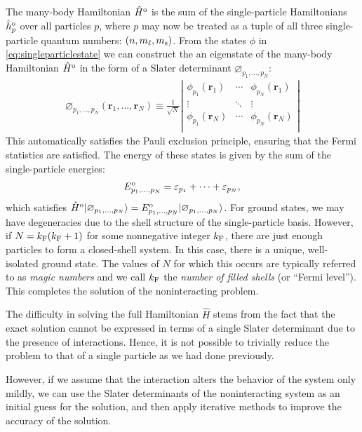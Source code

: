 \documentclass[amsmath, amssymb, aps, floatfix, nofootinbib, preprintnumbers,showpacs, superscriptaddress, twocolumn]{revtex4-1}
\newcommand{\ket}[1]{| #1 \rangle}
\begin{document}
The many-body Hamiltonian $\hat H^{\text o}$ is the sum of the single-particle
Hamiltonians $\hat h^{\text o}_p$ over all particles $p$, where $p$ may now be
treated as a tuple of all three single-particle quantum numbers:
$(n, m_\ell, m_{\text s})$.  From the states $\phi$ in
\eqref{eq:singleparticlestate} we can construct the an eigenstate of the
many-body Hamiltonian $\hat H^{\text o}$ in the form of a Slater determinant
$\varnothing_{p_1, \ldots, p_N}$:
\begin{align*}
  \varnothing_{p_1, \ldots, p_N}(\bm r_1, \ldots, \bm r_N) \equiv
  \frac{1}{\sqrt{N}} \left|
  \begin{matrix}
    \phi_{p_1}(\bm r_1) & \cdots & \phi_{p_N}(\bm r_1) \\
    \vdots & \ddots & \vdots \\
    \phi_{p_1}(\bm r_N) & \cdots & \phi_{p_N}(\bm r_N) \\
  \end{matrix}
  \right|
\end{align*}
This automatically satisfies the Pauli exclusion principle, ensuring that the
Fermi statistics are satisfied.  The energy of these states is given by the
sum of the single-particle energies:
\begin{align*}
  E^{\text o}_{p_1, \ldots, p_N} =
  \varepsilon_{p_1} + \cdots + \varepsilon_{p_N},
\end{align*}
which satisfies
$\hat{H}^{\text o} \ket{\varnothing_{p_1, \ldots, p_N}} = E^{\text o}_{p_1, \ldots,
  p_N} \ket{\varnothing_{p_1, \ldots, p_N}}$.  For ground states, we may have
degeneracies due to the shell structure of the single-particle basis.
However, if $N = k_{\text F} (k_{\text F} + 1)$ for some nonnegative integer
$k_{\text F}$, there are just enough particles to form a closed-shell system.
In this case, there is a unique, well-isolated ground state.  The values of
$N$ for which this occurs are typically referred to as \textit{magic numbers}
and we call $k_{\text F}$ the \textit{number of filled shells} (or ``Fermi
level'').  This completes the solution of the noninteracting problem.

The difficulty in solving the full Hamiltonian $\hat H$ stems from the fact
that the exact solution cannot be expressed in terms of a single Slater
determinant due to the presence of interactions.  Hence, it is not possible to
trivially reduce the problem to that of a single particle as we had done
previously.

However, if we assume that the interaction alters the behavior of the system
only mildly, we can use the Slater determinants of the noninteracting system
as an initial guess for the solution, and then apply iterative methods to
improve the accuracy of the solution.
\end{document}
